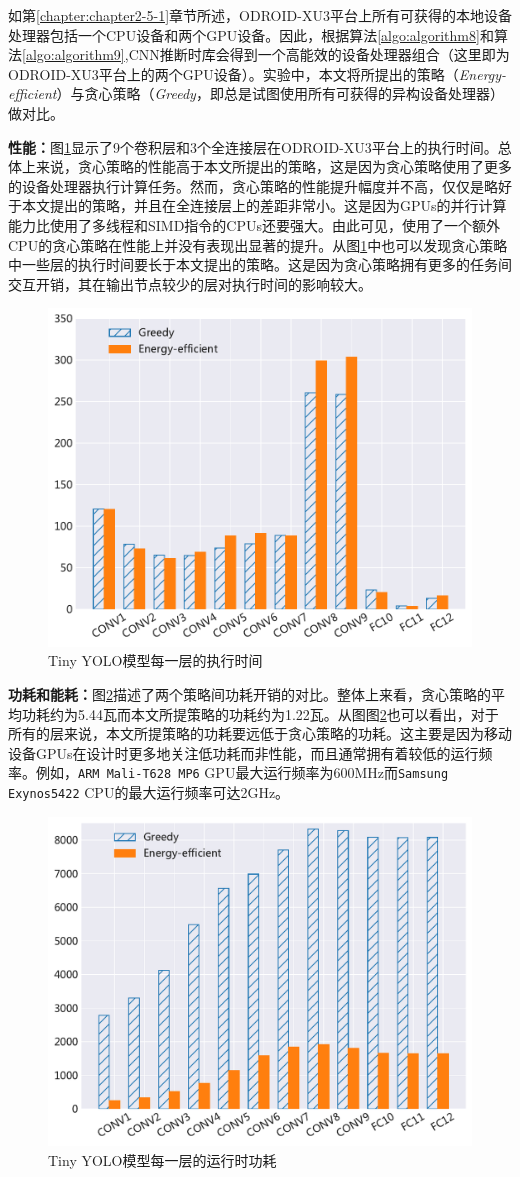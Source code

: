 如第\ref{chapter:chapter2-5-1}章节所述，ODROID-XU3平台上所有可获得的本地设备处理器包括一个CPU设备和两个GPU设备。因此，根据算法\ref{algo:algorithm8}和算法\ref{algo:algorithm9},CNN推断时库会得到一个高能效的设备处理器组合（这里即为ODROID-XU3平台上的两个GPU设备）。实验中，本文将所提出的策略（\emph{Energy-efficient}）与贪心策略（\emph{Greedy}，即总是试图使用所有可获得的异构设备处理器）做对比。

\textbf{性能：}图\ref{figure:figure32}显示了9个卷积层和3个全连接层在ODROID-XU3平台上的执行时间。总体上来说，贪心策略的性能高于本文所提出的策略，这是因为贪心策略使用了更多的设备处理器执行计算任务。然而，贪心策略的性能提升幅度并不高，仅仅是略好于本文提出的策略，并且在全连接层上的差距非常小。这是因为GPUs的并行计算能力比使用了多线程和SIMD指令的CPUs还要强大。由此可见，使用了一个额外CPU的贪心策略在性能上并没有表现出显著的提升。从图\ref{figure:figure32}中也可以发现贪心策略中一些层的执行时间要长于本文提出的策略。这是因为贪心策略拥有更多的任务间交互开销，其在输出节点较少的层对执行时间的影响较大。

\begin{figure}[htbp]
    \centering
    \includegraphics[height=0.4\textwidth]{figures/hc_time.pdf}
    \caption{Tiny YOLO模型每一层的执行时间}\label{figure:figure32}
\end{figure}

\textbf{功耗和能耗：}图\ref{figure:figure33}描述了两个策略间功耗开销的对比。整体上来看，贪心策略的平均功耗约为5.44瓦而本文所提策略的功耗约为1.22瓦。从图图\ref{figure:figure33}也可以看出，对于所有的层来说，本文所提策略的功耗要远低于贪心策略的功耗。这主要是因为移动设备GPUs在设计时更多地关注低功耗而非性能，而且通常拥有着较低的运行频率。例如，\texttt{ARM Mali-T628 MP6} GPU最大运行频率为600MHz而\texttt{Samsung Exynos5422} CPU的最大运行频率可达2GHz\cite{hardkernel.com}。

\begin{figure}[htbp]
    \centering
    \includegraphics[height=0.4\textwidth]{figures/hc_power.pdf}
    \caption{Tiny YOLO模型每一层的运行时功耗}\label{figure:figure33}
\end{figure}

